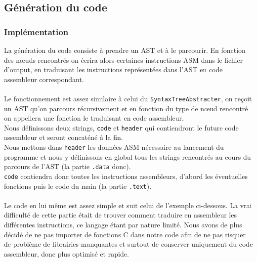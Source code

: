 \documentclass[a4paper,10pt]{article}
\begin{document}
\subsection{Génération du code}

	\subsubsection{Implémentation}
	La génération du code consiste à prendre un AST et à le parcourir. En fonction des nœuds rencontrés on écrira alors certaines instructions ASM dans le fichier d'output, en traduisant les instructions représentées dans l'AST en code assembleur correspondant.\\
	~\\
	Le fonctionnement est assez similaire à celui du \verb?SyntaxTreeAbstracter?, on reçoit un AST qu'on parcours récursivement et en fonction du type de nœud rencontré on appellera une fonction le traduisant en code assembleur.\\
	Nous définissons deux strings, \verb?code? et \verb?header? qui contiendront le future code assembleur et seront concaténé à la fin.\\
	Nous mettons dans \verb?header? les données ASM nécessaire au lancement du programme et nous y définissons en global tous les strings rencontrés au cours du parcours de l'AST (la partie \verb?.data? donc).\\
	\verb?code? contiendra donc toutes les instructions assembleurs, d'abord les éventuelles fonctions puis le code du main (la partie \verb?.text?).\\
	~\\
	Le code en lui même est assez simple et suit celui de l'exemple ci-dessous. La vrai difficulté de cette partie était de trouver comment traduire en assembleur les différentes instructions, ce langage étant par nature limité. Nous avons de plus décidé de ne pas importer de fonctions C dans notre code afin de ne pas risquer de problème de librairies manquantes et surtout de conserver uniquement du code assembleur, donc plus optimisé et rapide.\\
	
\end{document}
